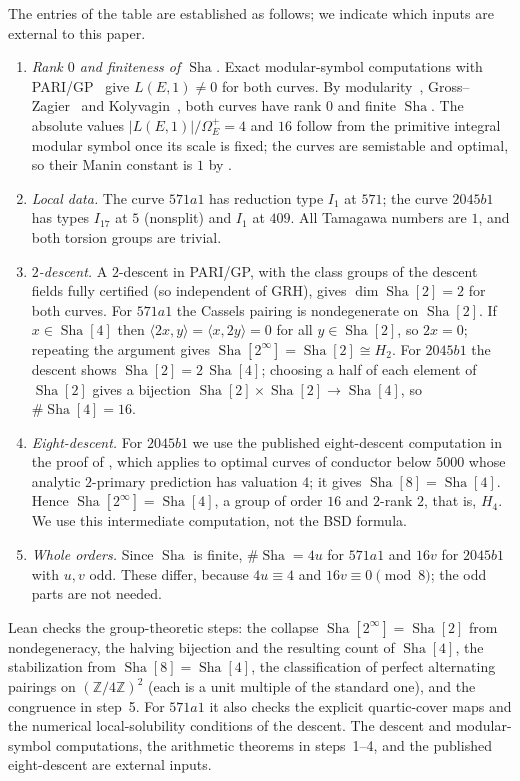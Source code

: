 \documentclass[11pt]{article}
\theoremstyle{definition}
\newcommand{\Z}{\mathbb{Z}}
\newcommand{\Sha}{\operatorname{Sha}}
\begin{document}
The entries of the table are established as follows; we indicate which
inputs are external to this paper.
\begin{enumerate}
\item \emph{Rank $0$ and finiteness of $\Sha$.}  Exact modular-symbol
  computations with PARI/GP~\citep{PARI2023} give $L(E,1)\neq0$ for both
  curves.  By modularity~\citep{Wiles1995,BreuilConradDiamondTaylor2001},
  Gross--Zagier~\citep{GrossZagier1986} and
  Kolyvagin~\citep{Kolyvagin1990}, both curves have rank $0$ and finite
  $\Sha$.  The absolute values $|L(E,1)|/\Omega_E^+=4$ and $16$ follow
  from the primitive integral modular symbol once its scale is fixed;
  the curves are semistable and optimal, so their Manin constant is $1$
  by \citet[Theorem~1.2]{Cesnavicius2018}.
\item \emph{Local data.}  The curve $571a1$ has reduction type $I_1$ at
  $571$; the curve $2045b1$ has types $I_{17}$ at $5$ (nonsplit) and $I_1$
  at $409$.  All Tamagawa numbers are $1$, and both torsion groups are
  trivial.
\item \emph{$2$-descent.}  A $2$-descent in PARI/GP, with the class
  groups of the descent fields fully certified (so independent of GRH),
  gives $\dim\Sha[2]=2$ for both curves.  For $571a1$ the Cassels pairing
  is nondegenerate on $\Sha[2]$.  If $x\in\Sha[4]$ then
  $\langle 2x,y\rangle=\langle x,2y\rangle=0$ for all $y\in\Sha[2]$, so
  $2x=0$; repeating the argument gives $\Sha[2^\infty]=\Sha[2]\cong
  H_2$.  For $2045b1$ the descent shows $\Sha[2]=2\,\Sha[4]$; choosing a
  half of each element of $\Sha[2]$ gives a bijection
  $\Sha[2]\times\Sha[2]\to\Sha[4]$, so $\#\Sha[4]=16$.
\item \emph{Eight-descent.}  For $2045b1$ we use the published
  eight-descent computation in the proof of
  \citet[Theorem~7.1]{Miller2011}, which applies to optimal curves of
  conductor below $5000$ whose analytic $2$-primary prediction has
  valuation $4$; it gives $\Sha[8]=\Sha[4]$.  Hence
  $\Sha[2^\infty]=\Sha[4]$, a group of order $16$ and $2$-rank $2$,
  that is, $H_4$.  We use this intermediate computation, not the BSD
  formula.
\item \emph{Whole orders.}  Since $\Sha$ is finite, $\#\Sha=4u$ for
  $571a1$ and $16v$ for $2045b1$ with $u,v$ odd.  These differ, because
  $4u\equiv4$ and $16v\equiv0\pmod 8$; the odd parts are not needed.
\end{enumerate}
Lean checks the group-theoretic steps: the collapse
$\Sha[2^\infty]=\Sha[2]$ from nondegeneracy, the halving bijection and
the resulting count of $\Sha[4]$, the stabilization from
$\Sha[8]=\Sha[4]$, the classification of perfect alternating pairings on
$(\Z/4\Z)^2$ (each is a unit multiple of the standard one), and the
congruence in step~5.  For $571a1$ it also checks the explicit
quartic-cover maps and the numerical local-solubility conditions of the
descent.  The descent and modular-symbol computations, the arithmetic
theorems in steps~1--4, and the published eight-descent are external
inputs.
\end{document}
